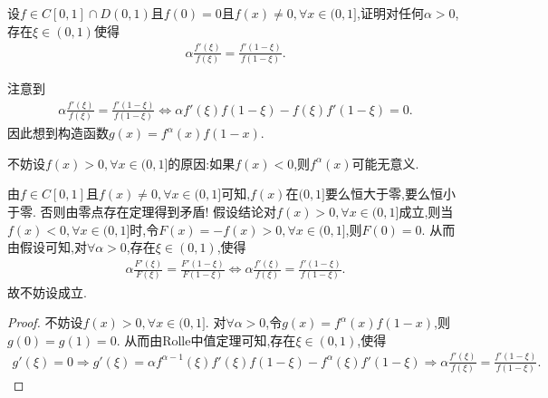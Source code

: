 \documentclass[../../main.tex]{subfiles}%
\begin{document}
\begin{example}
设\(f\in C[0,1]\cap D(0,1)\)且\(f(0)=0\)且\(f(x)\neq0,\forall x\in(0,1]\),证明对任何\(\alpha>0\),存在\(\xi\in(0,1)\)使得
\begin{align*}
\alpha\frac{f'(\xi)}{f(\xi)}=\frac{f'(1 - \xi)}{f(1 - \xi)}.
\end{align*} 
\end{example}
\begin{remark}
注意到
\begin{align*}
\alpha \frac{f' \left( \xi \right)}{f\left( \xi \right)}=\frac{f' \left( 1-\xi \right)}{f\left( 1-\xi \right)}\Leftrightarrow \alpha f' \left( \xi \right) f\left( 1-\xi \right) -f\left( \xi \right) f' \left( 1-\xi \right) =0.
\end{align*}
因此想到构造函数$g(x)=f^{\alpha}(x)f(1 - x)$.
\end{remark}
\begin{note}
不妨设\(f(x)>0,\forall x\in(0,1]\)的原因:如果$f(x)<0$,则$f^{\alpha}(x)$可能无意义.

由\(f\in C[0,1]\)且\(f(x)\neq0,\forall x\in(0,1]\)可知,\(f(x)\)在\((0,1]\)要么恒大于零,要么恒小于零. 否则由零点存在定理得到矛盾! 假设结论对\(f(x)>0,\forall x\in(0,1]\)成立,则当\(f(x)<0,\forall x\in(0,1]\)时,令\(F(x)=-f(x)>0,\forall x\in(0,1]\),则\(F(0)=0\). 从而由假设可知,对\(\forall \alpha>0\),存在\(\xi\in(0,1)\),使得
\begin{align*}
\alpha \frac{F'(\xi)}{F(\xi)}=\frac{F'(1 - \xi)}{F(1 - \xi)}\Leftrightarrow \alpha \frac{f'(\xi)}{f(\xi)}=\frac{f'(1 - \xi)}{f(1 - \xi)}.
\end{align*}
故不妨设成立. 
\end{note}
\begin{proof}

不妨设\(f(x)>0,\forall x\in(0,1]\). 对$\forall \alpha>0$,令\(g(x)=f^{\alpha}(x)f(1 - x)\),则\(g(0)=g(1)=0\). 从而由Rolle中值定理可知,存在\(\xi\in(0,1)\),使得
\begin{align*}
g'(\xi) = 0\Rightarrow g'(\xi)=\alpha f^{\alpha - 1}(\xi)f'(\xi)f(1 - \xi)-f^{\alpha}(\xi)f'(1 - \xi)
\Rightarrow \alpha \frac{f'(\xi)}{f(\xi)}=\frac{f'(1 - \xi)}{f(1 - \xi)}.
\end{align*}

\end{proof}
\end{document}
